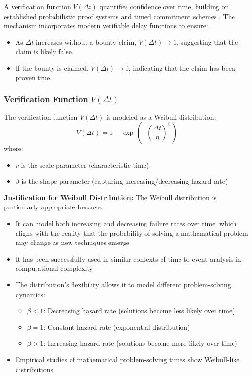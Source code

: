 \documentclass[12pt]{report}
\begin{document}
A verification function \( V(\Delta t) \) quantifies confidence over time, building on established probabilistic proof systems \cite{BabaiMoran1988} and timed commitment schemes \cite{BonehNaor2000}. The mechanism incorporates modern verifiable delay functions \cite{BonehBunzFisch2018} to ensure:

\begin{itemize}
    \item As \( \Delta t \) increases without a bounty claim, \( V(\Delta t) \rightarrow 1 \), suggesting that the claim is likely false.
    \item If the bounty is claimed, \( V(\Delta t) \rightarrow 0 \), indicating that the claim has been proven true.
\end{itemize}

\subsubsection{Verification Function \( V(\Delta t) \)}
The verification function \( V(\Delta t) \) is modeled as a Weibull distribution:
\begin{equation}
    V(\Delta t) = 1 - \exp\left(-\left(\frac{\Delta t}{\eta}\right)^\beta\right)
\end{equation}
where:
\begin{itemize}
    \item \(\eta\) is the scale parameter (characteristic time)
    \item \(\beta\) is the shape parameter (capturing increasing/decreasing hazard rate)
\end{itemize}

\textbf{Justification for Weibull Distribution:}
The Weibull distribution is particularly appropriate because:
\begin{itemize}
    \item It can model both increasing and decreasing failure rates over time, which aligns with the reality that the probability of solving a mathematical problem may change as new techniques emerge
    \item It has been successfully used in similar contexts of time-to-event analysis in computational complexity \cite{HisanoSornette2012}
    \item The distribution's flexibility allows it to model different problem-solving dynamics:
    \begin{itemize}
        \item \(\beta < 1\): Decreasing hazard rate (solutions become less likely over time)
        \item \(\beta = 1\): Constant hazard rate (exponential distribution)
        \item \(\beta > 1\): Increasing hazard rate (solutions become more likely over time)
    \end{itemize}
    \item Empirical studies of mathematical problem-solving times show Weibull-like distributions \cite{GhoshAdhikaryPaul2017}
\end{itemize}
\end{document}
